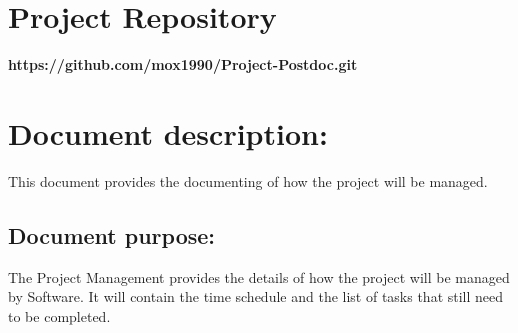 \documentclass[12pt]{article}
\newcommand{\repo}{https://github.com/mox1990/Project-Postdoc.git}
\begin{document}
\listoffigures
\newpage
\section{Project Repository}
\textbf{\repo}
\newpage
\section{Document description:}
This document provides the documenting of how the project will be managed.

\subsection{Document purpose:}
\vspace{0.2in}
The Project Management provides the details of how the project will be managed by Software. It will contain the time schedule and the list of tasks that still need to be completed.

\vspace{0.2in}

\newpage
\end{document}
